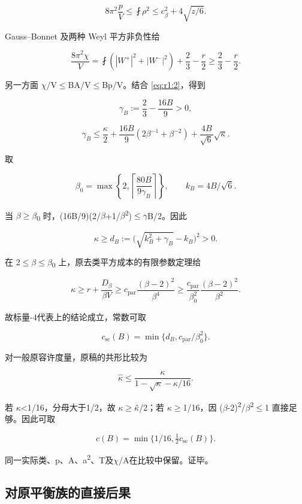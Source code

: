 \documentclass[UTF8,11pt,fontset=none]{ctexart}
\begin{document}
\[
8\pi^2\frac pV\le\fint\rho^2
\le c_\beta^2+4\sqrt{z/6}.
\tag{1.2}\label{eq:r1:2}
\]

Gauss--Bonnet 及两种 Weyl 平方非负性给

\[
\frac{8\pi^2\chi}V
=\fint(|W^+|^2+|W^-|^2)+\frac23-\frac r2
\ge\frac23-\frac r2.
\]

另一方面 \(\chi\)/V\(\le\)BA/V\(\le\)Bp/V。结合 \eqref{eq:r1:2}，得到

\[
\gamma_B:=\frac23-\frac{16B}{9}>0,
\]

\[
\gamma_B\le\frac\kappa2+
\frac{16B}{9}(2\beta^{-1}+\beta^{-2})
+\frac{4B}{\sqrt6}\sqrt\kappa.
\tag{1.3}\label{eq:r1:3}
\]

取

\[
\beta_0=\max\left\{2,\left\lceil\frac{80B}{9\gamma_B}\right\rceil\right\},
\qquad k_B=4B/\sqrt6.
\]

当 \(\beta\)\(\ge\)\(\beta\)\textsubscript{0} 时，(16B/9)(2/\(\beta\)+1/\(\beta\)\textsuperscript{2})\(\le\)\(\gamma\)B/2。因此

\[
\kappa\ge d_B:=\bigl(\sqrt{k_B^2+\gamma_B}-k_B\bigr)^2>0.
\tag{1.4}\label{eq:r1:4}
\]

在 2\(\le\)\(\beta\)\(\le\)\(\beta\)\textsubscript{0} 上，原去类平方成本的有限参数定理给

\[
\kappa\ge r+\frac{D_\beta}{\beta V}
\ge c_{\mathrm{par}}\frac{(\beta-2)^2}{\beta^4}
\ge\frac{c_{\mathrm{par}}}{\beta_0^2}
\frac{(\beta-2)^2}{\beta^2}.
\]

故标量-4代表上的结论成立，常数可取

\[
c_{\mathrm{sc}}(B)=\min\{d_B,c_{\mathrm{par}}/\beta_0^2\}.
\]

对一般原容许度量，原稿的共形比较为

\[
\widehat\kappa\le
\frac{\kappa}{1-\sqrt\kappa-\kappa/16}.
\]

若 \(\kappa\)\textless1/16，分母大于1/2，故 \(\kappa\)\(\ge\)\(\kappa\)̂/2；若 \(\kappa\)\(\ge\)1/16，因 (\(\beta\)-2)\textsuperscript{2}/\(\beta\)\textsuperscript{2}\(\le\)1 直接足够。因此可取

\[
\boxed{c(B)=\min\{1/16,\tfrac12c_{\mathrm{sc}}(B)\}.}
\]

同一实际类、p、A、a\textsuperscript{2}、T及\(\chi\)/A在比较中保留。证毕。

\subsection{对原平衡族的直接后果}\label{ch1:ux5bf9ux539fux5e73ux8861ux65cfux7684ux76f4ux63a5ux540eux679c}
\end{document}
